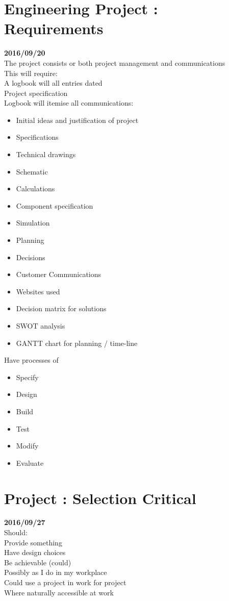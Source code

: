 \section{Engineering Project : Requirements}\textbf{2016/09/20}\\
The project consists or both project management and communications\\
This will require:\\
A logbook will all entries dated\\
Project specification\\
Logbook will itemise all communications:
\begin{itemize}
  \item Initial ideas and justification of project
  \item Specifications
  \item Technical drawings
  \item Schematic
  \item Calculations
  \item Component specification
  \item Simulation
  \item Planning
  \item Decisions
  \item Customer Communications
  \item Websites used
  \item Decision matrix for solutions
  \item SWOT analysis
  \item GANTT chart for planning / time-line
\end{itemize}


Have processes of
\begin{itemize}
  \item Specify
  \item Design
  \item Build
  \item Test
  \item Modify
  \item Evaluate
\end{itemize}

\section{Project : Selection Critical}\textbf{2016/09/27}\\
Should:\\
Provide something\\
Have design choices\\
Be achievable (could)\\
Possibly as I do in my workplace\\
Could use a project in work for project\\
 Where naturally accessible at work\\


